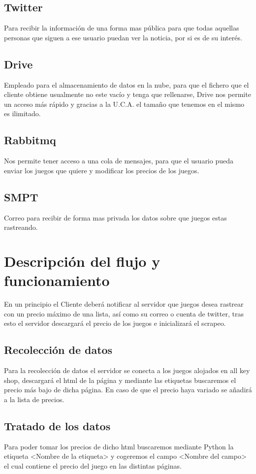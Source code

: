 \documentclass[12pt,letterpaper]{article}
\begin{document}
			\subsection{Twitter}
				Para recibir la información de una forma mas pública para que todas aquellas personas que siguen a ese usuario puedan ver la noticia, por si es de su interés.
			\subsection{Drive}
				Empleado para el almacenamiento de datos en la nube, para que el fichero que el cliente obtiene usualmente no este vacío y tenga que rellenarse, Drive nos permite un acceso más rápido y gracias a la U.C.A. el tamaño que tenemos en el mismo es ilimitado.
			\subsection{Rabbitmq}
				Nos permite tener acceso a una cola de mensajes, para que el usuario pueda enviar los juegos que quiere y modificar los precios de los juegos.
			\subsection{SMPT}
				Correo para recibir de forma mas privada los datos sobre que juegos estas rastreando.
		\newpage	
		\section{Descripción del flujo y funcionamiento}
			En un principio el Cliente deberá notificar al servidor que juegos desea rastrear con un precio máximo de una lista, así como su correo o cuenta de twitter, tras esto el servidor descargará el precio de los juegos e inicializará el scrapeo.
			\subsection{Recolección de datos}
				Para la recolección de datos el servidor se conecta a los juegos alojados en all key shop, descargará el html de la página y mediante las etiquetas buscaremos el precio más bajo de dicha página. En caso de que el precio haya variado se añadirá a la lista de precios.
			\subsection{Tratado de los datos}
				Para poder tomar los precios de dicho html buscaremos mediante Python la etiqueta <Nombre de la etiqueta> y cogeremos el campo <Nombre del campo> el cual contiene el precio del juego en las distintas páginas.\\
				
\end{document}
